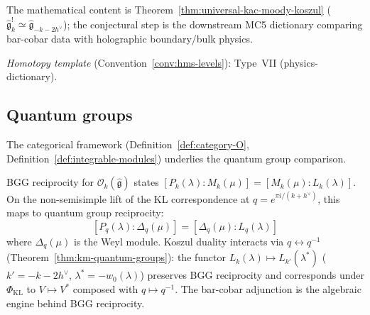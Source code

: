 \begin{remark}[Scope]
The mathematical content is Theorem~\ref{thm:universal-kac-moody-koszul} ($\widehat{\mathfrak{g}}_k^! \simeq \widehat{\mathfrak{g}}_{-k-2h^\vee}$); the conjectural step is the downstream MC5 dictionary comparing bar-cobar data with holographic boundary/bulk physics.

\emph{Homotopy template} (Convention~\ref{conv:hms-levels}): Type~VII (physics-dictionary).
\end{remark}

\subsection{Quantum groups}
\label{sec:km-quantum-groups}

The categorical framework
(Definition~\ref{def:category-O},
Definition~\ref{def:integrable-modules})
underlies the quantum group comparison.
\label{def:category-O-affine}

\begin{remark}\label{rem:bgg-kl-bridge}
BGG reciprocity for $\mathcal{O}_k(\widehat{\mathfrak{g}})$ states $[P_k(\lambda) : M_k(\mu)] = [M_k(\mu) : L_k(\lambda)]$.  On the non-semisimple lift of the KL correspondence at $q = e^{\pi i/(k+h^\vee)}$, this maps to quantum group reciprocity:
\[
[P_q(\lambda) : \Delta_q(\mu)] = [\Delta_q(\mu) : L_q(\lambda)]
\]
where $\Delta_q(\mu)$ is the Weyl module.  Koszul duality interacts via $q \leftrightarrow q^{-1}$ (Theorem~\ref{thm:km-quantum-groups}): the functor $L_k(\lambda) \mapsto L_{k'}(\lambda^*)$ ($k' = -k-2h^\vee$, $\lambda^* = -w_0(\lambda)$) preserves BGG reciprocity and corresponds under $\Phi_{\mathrm{KL}}$ to $V \mapsto V^*$ composed with $q \mapsto q^{-1}$.  The bar-cobar adjunction is the algebraic engine behind BGG reciprocity.
\end{remark}

